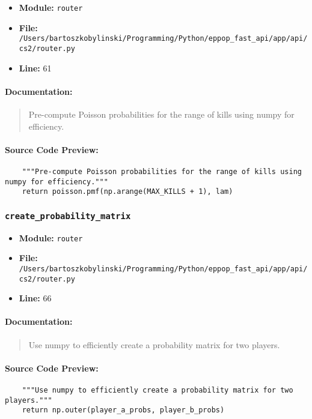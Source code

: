 \documentclass[11pt,a4paper]{article}
\begin{document}
\begin{itemize}
    \item \textbf{Module:} \texttt{router}
    \item \textbf{File:} \texttt{/Users/bartoszkobylinski/Programming/Python/eppop\_fast\_api/app/api/cs2/router.py}
    \item \textbf{Line:} 61
\end{itemize}

\paragraph{Documentation:}
\begin{quote}
Pre-compute Poisson probabilities for the range of kills using numpy for efficiency.
\end{quote}

\paragraph{Source Code Preview:}
\begin{verbatim}
    """Pre-compute Poisson probabilities for the range of kills using numpy for efficiency."""
    return poisson.pmf(np.arange(MAX_KILLS + 1), lam)
\end{verbatim}

\vspace{1em}
\subsubsection{\texttt{create\_probability\_matrix}}

\begin{itemize}
    \item \textbf{Module:} \texttt{router}
    \item \textbf{File:} \texttt{/Users/bartoszkobylinski/Programming/Python/eppop\_fast\_api/app/api/cs2/router.py}
    \item \textbf{Line:} 66
\end{itemize}

\paragraph{Documentation:}
\begin{quote}
Use numpy to efficiently create a probability matrix for two players.
\end{quote}

\paragraph{Source Code Preview:}
\begin{verbatim}
    """Use numpy to efficiently create a probability matrix for two players."""
    return np.outer(player_a_probs, player_b_probs)
\end{verbatim}
\end{document}
